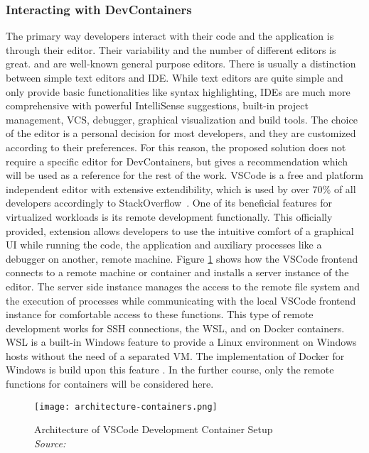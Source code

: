         \subsubsection{Interacting with DevContainers}
        The primary way developers interact with their code and the application is through their editor. Their variability and the number of different editors is great.  and  are well-known general purpose editors. There is usually a distinction between simple text editors and \acl{IDE}. While text editors are quite simple and only provide basic functionalities like syntax highlighting, \ac{IDE}s are much more comprehensive with powerful IntelliSense suggestions, built-in project management, \ac{VCS}, debugger, graphical visualization and build tools. The choice of the editor is a personal decision for most developers, and they are customized according to their preferences. For this reason, the proposed solution does not require a specific editor for DevContainers, but gives a recommendation which will be used as a reference for the rest of the work.\newline
        \ac{VSCode} is a free and platform independent editor with extensive extendibility, which is used by over 70\% of all developers accordingly to StackOverflow~\cite{stackoverflow2021}. One of its beneficial features for virtualized workloads is its remote development functionally. This officially provided, extension allows developers to use the intuitive comfort of a graphical \ac{UI} while running the code, the application and auxiliary processes like a debugger on another, remote machine. Figure \ref{fig::vscodecontainer} shows how the \ac{VSCode} frontend connects to a remote machine or container and installs a server instance of the editor. The server side instance manages the access to the remote file system and the execution of processes while communicating with the local \ac{VSCode} frontend instance for comfortable access to these functions. This type of remote development works for \ac{SSH} connections, the \ac{WSL}, and on Docker containers. \ac{WSL} is a built-in Windows feature to provide a Linux environment on Windows hosts without the need of a separated \ac{VM}. The implementation of Docker for Windows is build upon this feature \cite{vscodedevcontainer}. In the further course, only the remote functions for containers will be considered here.
        \begin{figure}
            \centering
            \texttt{[image: architecture-containers.png]}
            \caption{Architecture of \ac{VSCode} Development Container Setup \\\textit{Source:~\cite{vscodedevcontainer}}}\label{fig::vscodecontainer}
        \end{figure}
